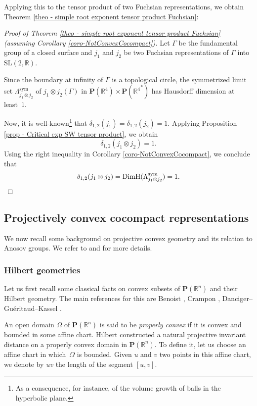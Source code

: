 \documentclass[JEP,XML,SOM,Unicode,NoEqCountersInSection,NoFloatCountersInSection,published]{cedram}
\theoremstyle{definition}
\newcommand{\proj}{\mathbf{P}}
\newcommand{\R}{\mathbb{R}}
\newcommand{\SL}{\mathrm{SL}}
\DeclareMathOperator{\DimH}{DimH}
\begin{document}
Applying this to the tensor product of two Fuchsian representations, we obtain Theorem \ref{theo - simple root exponent tensor product Fuchsian}:

\begin{proof}[Proof of Theorem \ref{theo - simple root exponent tensor product Fuchsian} (assuming Corollary \ref{coro-NotConvexCocompact})]
Let $\Gamma$ be the fundamental group of a closed surface and $j_1$ and $j_2$ be two Fuchsian representations of $\Gamma$ into $\SL(2,\R)$.

Since the boundary at infinity of $\Gamma$ is a topological circle, the symmetrized limit set $\Lambda_{j_1\otimes j_2}^{\mathrm{sym}}$ of $j_1\otimes j_2(\Gamma)$ in $\proj(\R^4)\times \proj({\R^4}^*)$ has Hausdorff dimension at least~$1$.

Now, it is well-known\footnote{As a consequence, for instance, of the volume growth of balls in the hyperbolic plane.} that $\delta_{1,2}(j_1) = \delta_{1,2}(j_2) = 1$. Applying Proposition \ref{prop - Critical exp SW tensor product}, we obtain
\[\delta_{1,2}(j_1\otimes j_2) =1.\]
Using the right inequality in Corollary \ref{coro-NotConvexCocompact}, we conclude that
\[\delta_{1,2}(j_1\otimes j_2) = \DimH(\Lambda_{j_1\otimes j_2}^{\mathrm{sym}}) = 1.\qedhere\]
\end{proof}

\subsection{Projectively convex cocompact representations}\label{subsec - projectively cc representations}

We now recall some background on projective convex geometry and its relation to Anosov groups. We refer to \cite{DGK} and \cite{zimmer} for more details.

\subsubsection{Hilbert geometries}

Let us first recall some classical facts on convex subsets of $\proj(\R^n)$ and their Hilbert geometry. The main references for this are Benoist \cite{Benoist2001convexe}, Crampon \cite{crampon2009entropies,crampon2011dynamics}, Danciger--Guéritaud--Kassel \cite{DGK}.

An open domain $\Omega$ of $\proj(\R^n)$ is said to be \emph{properly convex} if it is convex and bounded in some affine chart. Hilbert constructed a natural projective invariant distance on a properly convex domain in $\proj(\R^n)$. To define it, let us choose an affine chart in which~$\Omega$ is bounded. Given $u$ and $v$ two points in this affine chart, we denote by $uv$ the length of the segment $[u,v]$.
\end{document}
